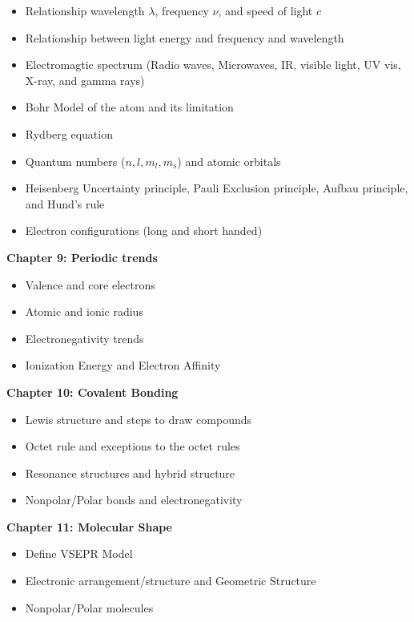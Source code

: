 \documentclass[12pt]{article}
\begin{document}
\begin{itemize}
  \setlength\itemsep{0em}
\item Relationship wavelength $\lambda$, frequency $\nu$, and speed of light $c$
\item Relationship between light energy and frequency and wavelength
\item Electromagtic spectrum (Radio waves, Microwaves, IR, visible light, UV vis, X-ray, and gamma rays)
\item Bohr Model of the atom and its limitation
\item Rydberg equation
\item Quantum numbers ($n, l, m_l, m_s$) and atomic orbitals
\item Heisenberg Uncertainty principle, Pauli Exclusion principle, Aufbau principle, and
  Hund's rule
\item Electron configurations (long and short handed)
\end{itemize}

\textbf{Chapter 9: Periodic trends}

\begin{itemize}
  \setlength\itemsep{0em}
\item Valence and core electrons
\item Atomic and ionic radius
\item Electronegativity trends
\item Ionization Energy and Electron Affinity
\end{itemize}

\textbf{Chapter 10: Covalent Bonding}

\begin{itemize}
  \setlength\itemsep{0em}
\item Lewis structure and steps to draw compounds
\item Octet rule and exceptions to the octet rules
\item Resonance structures and hybrid structure
\item Nonpolar/Polar bonds and electronegativity
\end{itemize}

\textbf{Chapter 11: Molecular Shape}

\begin{itemize}
  \setlength\itemsep{0em}
\item Define VSEPR Model
\item Electronic arrangement/structure and Geometric Structure
\item Nonpolar/Polar molecules
\end{itemize}
\end{document}
